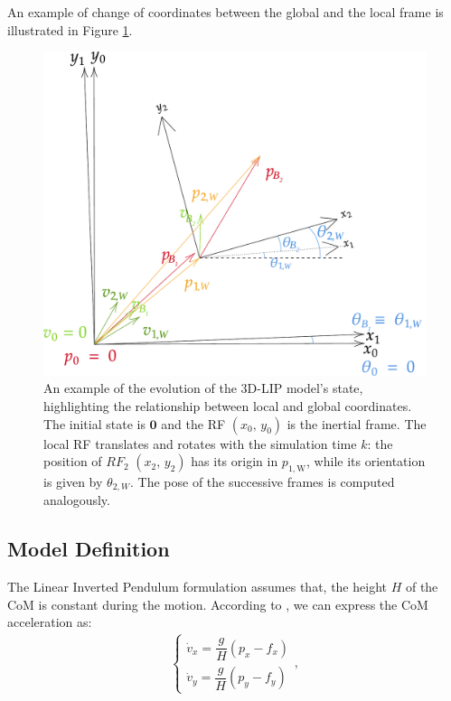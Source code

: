 An example of change of coordinates between the global and the local frame is illustrated in Figure \ref{fig:loc_to_glob_tfm}.


\begin{figure}[h]
    \centering
    \includegraphics[width=0.75\linewidth]{figures/LIP/loc_to_glob_tfm3.pdf}
    \caption{An example of the evolution of the 3D-LIP model's state, highlighting the relationship between local and global coordinates. The initial state is $\mathbf{0}$ and the RF $(x_0,\, y_0)$ is the inertial frame. The local RF translates and rotates with the simulation time $k$: the position of $RF_2$ $(x_2,\, y_2)$ has its origin in $p_{1, \text{W}}$, while its orientation is given by $\theta_{2, W}$. The pose of the successive frames is computed analogously.}
    \label{fig:loc_to_glob_tfm}
\end{figure}

\subsection{Model Definition}
The Linear Inverted Pendulum formulation assumes that, the height $H$ of the CoM is constant during the motion.
According to \cite{peng_main_paper}, we can express the CoM acceleration as:
\begin{align}
    \begin{cases}
        \dot{v}_{x} = \dfrac{g}{H}(p_{x} - f_{x})
        \\[1ex]
        \dot{v}_{y} = \dfrac{g}{H}(p_{y} - f_{y})
    \end{cases},
\end{align}

